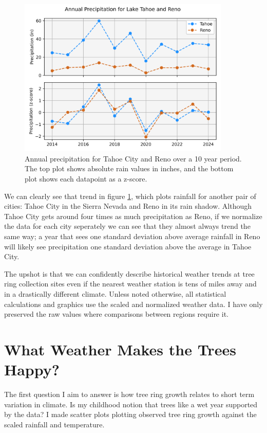 \documentclass[]{article}
\begin{document}
\begin{figure}[h]
	\centering
	\includegraphics[width=0.9\textwidth]{renotahoe.png}
	\caption{Annual precipitation for Tahoe City and Reno over a 10 year period. The top plot shows absolute rain values in inches, and the bottom plot shows each datapoint as a z-score.}
	\label{fig:reno_tahoe}
\end{figure}
We can clearly see that trend in figure \ref{fig:reno_tahoe}, which plots rainfall for another pair of cities: Tahoe City in the Sierra Nevada and Reno in its rain shadow. Although Tahoe City gets around four times as much precipitation as Reno, if we normalize the data for each city seperately we can see that they almost always trend the same way; a year that sees one standard deviation above average rainfall in Reno will likely see precipitation one standard deviation above the average in Tahoe City.

The upshot is that we can confidently describe historical weather trends at tree ring collection sites even if the nearest weather station is tens of miles away and in a drastically different climate. Unless noted otherwise, all statistical calculations and graphics use the scaled and normalized weather data. I have only preserved the raw values where comparisons between regions require it.

\section{What Weather Makes the Trees Happy?}
The first question I aim to answer is how tree ring growth relates to short term variation in climate. Is my childhood notion that trees like a wet year supported by the data?  I made scatter plots plotting observed tree ring growth against the scaled rainfall and temperature.
\end{document}
